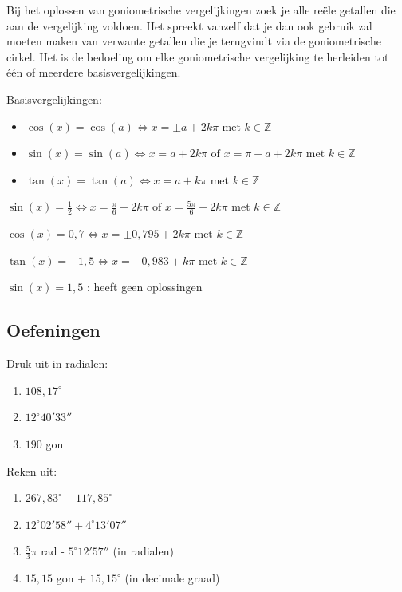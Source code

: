Bij het oplossen van goniometrische vergelijkingen zoek je alle reële getallen die aan de vergelijking voldoen. Het spreekt vanzelf dat je dan ook gebruik zal moeten maken van verwante getallen die je terugvindt via de goniometrische cirkel. 
Het is de bedoeling om elke goniometrische vergelijking te herleiden tot één of meerdere basisvergelijkingen.

Basisvergelijkingen:
\begin{itemize}
	\item $\cos(x)=\cos(a) \iff x = \pm a+2k \pi \text{ met } k\in \mathbb{Z} $
	\item $\sin(x)=\sin(a) \iff x = a+2k  \pi  \text{ of } x=\pi-a+2 k \pi \text{ met } k \in \mathbb{Z} $
	\item $\tan(x)=\tan(a)\iff x = a+k \pi \text{ met } k\in \mathbb{Z} $ 
\end{itemize}


\begin{voorbeeld}
$\sin(x)=\frac{1}{2} \iff x=\frac{\pi}{6}+2k \pi \text{ of } x= \frac{5\pi}{6}+2 k \pi \text{ met } k\in \mathbb{Z} $
\end{voorbeeld}
\begin{voorbeeld}
$\cos(x)=0,7 \iff x=\pm 0,795+2k \pi \text{ met } k\in \mathbb{Z} $
\end{voorbeeld}
\begin{voorbeeld}
$\tan(x)=-1,5 \iff x=- 0,983+k \pi \text{ met } k\in \mathbb{Z} $
\end{voorbeeld}
\begin{voorbeeld}
$\sin(x)=1,5 $  : heeft geen oplossingen
\end{voorbeeld}


\subsection{Oefeningen}

\begin{oef}
	Druk uit in radialen:
	\begin{enumerate}
		\item $108,17^\circ$ 
		\item $12^\circ 40' 33''$ 
		\item $190$ gon
	\end{enumerate}
\end{oef}

\begin{oef}
	Reken uit:
	\begin{enumerate}
		\item $267,83^\circ - 117,85^\circ$
		\item $12^\circ 02' 58'' + 4^\circ 13' 07''$
		\item $\frac{5}{3}\pi$ rad - $5^\circ 12' 57''$ (in radialen)
		\item $15,15$ gon + $15,15^\circ$ (in decimale graad)
	\end{enumerate}
\end{oef}

